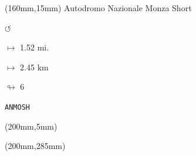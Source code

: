 \begin{textblock*}{40mm}(160mm,15mm)%
Autodromo Nazionale Monza Short
\par \Huge$\circlearrowleft$
\Large
\par$\mapsto$ 1.52 mi.
\par$\mapsto$ 2.45 km
\par$\looparrowright$ 6
\par\hfill\tiny\tt ANMOSH\\
\end{textblock*}
\begin{textblock*}{20mm}(200mm,5mm)%
\fbox{\thepage}
\end{textblock*}
\begin{textblock*}{20mm}(200mm,285mm)%
\fbox{\thepage}
\end{textblock*}
\null\newpage

